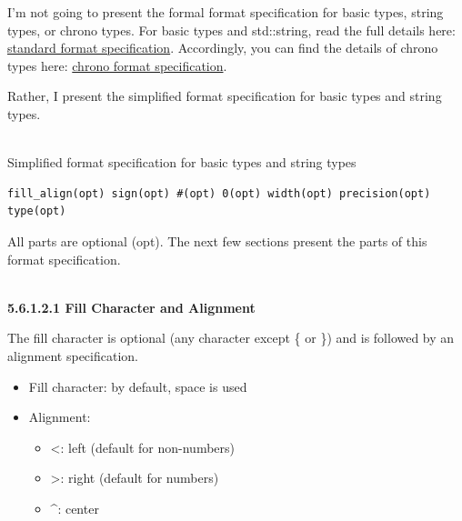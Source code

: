 I’m not going to present the formal format specification for basic types, string types, or chrono types. For basic types and std::string, read the full details here: \href{https://en.cppreference.com/w/cpp/utility/format/formatter#Standard_format_specification}{standard format specification}. Accordingly, you can find the details of chrono types here: \href{https://en.cppreference.com/w/cpp/chrono/system_clock/formatter#Format_specification}{chrono format specification}.

Rather, I present the simplified format specification for basic types and string types.

\hspace*{\fill} \\ %
\noindent
Simplified format specification for basic types and string types
\begin{lstlisting}[style=styleCXX]
fill_align(opt) sign(opt) #(opt) 0(opt) width(opt) precision(opt) type(opt)
\end{lstlisting}

All parts are optional (opt). The next few sections present the parts of this format specification.

\hspace*{\fill} \\ %
\noindent
\textbf{5.6.1.2.1\hspace{0.2cm} Fill Character and Alignment}

The fill character is optional (any character except \{ or \}) and is followed by an alignment specification.

\begin{itemize}
\item 
Fill character: by default, space is used

\item 
Alignment:
\begin{itemize}
\item 
<: left (default for non-numbers)

\item 
>: right (default for numbers)

\item 
\^{}: center
\end{itemize}
\end{itemize}

